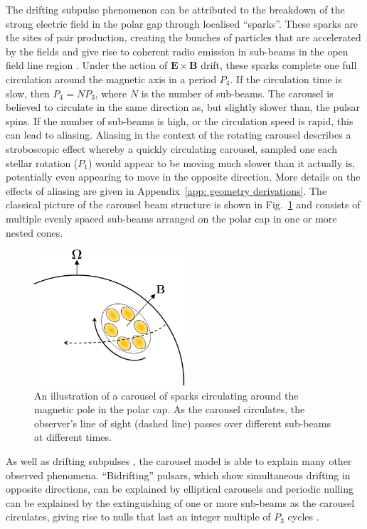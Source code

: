 The drifting subpulse phenomenon can be attributed to the breakdown of the strong electric field in the polar gap through localised ``sparks''. These sparks are the sites of pair production, creating the bunches of particles that are accelerated by the fields and give rise to coherent radio emission in sub-beams in the open field line region \citep{RSxx1975, CRxx1977, Bxxx1982, FRxx1982,GSxx2000}. Under the action of $\mathbf{E} \times \mathbf{B}$ drift, these sparks complete one full circulation around the magnetic axis in a period $P_4$.  If the circulation time is slow, then $P_4 = NP_3$, where $N$ is the number of sub-beams. The carousel is believed to circulate in the same direction as, but slightly slower than, the pulsar spins. If the number of sub-beams is high, or the circulation speed is rapid, this can lead to aliasing. Aliasing in the context of the rotating carousel describes a stroboscopic effect whereby a quickly circulating carousel, sampled one each stellar rotation ($P_1$) would appear to be moving much slower than it actually is, potentially even appearing to move in the opposite direction. More details on the effects of aliasing are given in Appendix~\ref{app: geometry derivations}. The classical picture of the carousel beam structure is shown in Fig.~\ref{fig: intro - carousel schematic} and consists of multiple evenly spaced sub-beams arranged on the polar cap in one or more nested cones.
\begin{figure}
	\centering
	\includegraphics[width=0.5\textwidth]{Figures/Introduction/carousel_schematic}
    \caption[Drifting subpulses and the definitions of $P_2$ and $P_3$]{An illustration of a carousel of sparks circulating around the magnetic pole in the polar cap. As the carousel circulates, the observer's line of sight (dashed line) passes over different sub-beams at different times.}
    \label{fig: intro - carousel schematic} 
\end{figure}
As well as drifting subpulses \citep[e.g.][]{GSxx2000,GMxx2001,WESx2006,WSEx2007}, the carousel model is able to explain many other observed phenomena. ``Bidrifting'' pulsars, which show simultaneous drifting in opposite directions, can be explained by elliptical carousels \citep{QLZ+2004, Wxxx2016, WWxx2017, SLxx2017, SLWM2020} and periodic nulling can be explained by the extinguishing of one or more sub-beams as the carousel circulates, giving rise to nulls that last an integer multiple of $P_3$ cycles \citep{HRxx2007, HRxx2009, RWxx2008}.

